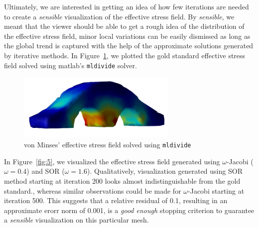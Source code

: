 \documentclass[11pt,titlepage]{article}
\begin{document}
Ultimately, we are interested in getting an idea of how few iterations are needed to create a \textit{sensible} visualization of the effective stress field. By \textit{sensible}, we meant that the viewer should be able to get a rough idea of the distribution of the effective stress field, minor local variations can be easily dismissed as long as the global trend is captured with the help of the approximate solutions generated by iterative methods. In Figure~\ref{fig:4}, we plotted the gold standard effective stress field solved using matlab's \texttt{mldivide} solver. 
\begin{figure}[!htbp]
    \begin{center}
        \includegraphics[width=3in]{goldstandard_vm/resized/archbridge_tiny_goldstandard}
        \caption{\label{fig:4} von Minses' effective stress field solved using \texttt{mldivide}}
    \end{center}
\end{figure}
In Figure~\ref{fig:5}, we visualized the effective stress field generated using $\omega$-Jacobi ($\omega=0.4$) and SOR ($\omega=1.6$). Qualitatively, visualization generated using SOR method starting at iteration 200 looks almost indistinguishable from the gold standard., whereas similar observations could be made for $\omega$-Jacobi starting at iteration 500. This suggests that a relative residual of 0.1, resulting in an approximate erorr norm of 0.001, is a \textit{good enough} stopping criterion to guarantee a \textit{sensible} visualization on this particular mesh.
\end{document}
